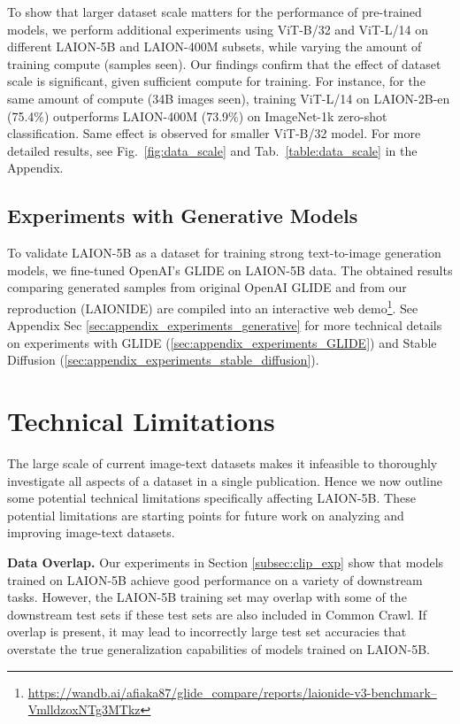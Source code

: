 To show that larger dataset scale matters for the performance of pre-trained models, we perform additional experiments using  ViT-B/32 and ViT-L/14 on different LAION-5B and LAION-400M subsets, while varying the amount of training compute (samples seen). Our findings confirm that the effect of dataset scale is significant, given sufficient compute for training. For instance, for the same amount of compute (34B images seen), training ViT-L/14 on LAION-2B-en (75.4\%) outperforms LAION-400M (73.9\%) on ImageNet-1k zero-shot classification. Same effect is observed for smaller ViT-B/32 model. For more detailed results, see Fig.~\ref{fig:data_scale} and Tab.~\ref{table:data_scale} in the Appendix.  

\subsection{Experiments with Generative Models}

\label{subsec:laionide_exp}
To validate LAION-5B as a dataset for training strong text-to-image generation models, we fine-tuned OpenAI's GLIDE \cite{GLIDE} on LAION-5B data. The obtained results comparing generated samples from original OpenAI GLIDE and from our reproduction (LAIONIDE) are compiled into an interactive web demo\footnote{\href{https://wandb.ai/afiaka87/glide_compare/reports/laionide-v3-benchmark--VmlldzoxNTg3MTkz}{https://wandb.ai/afiaka87/glide\_compare/reports/laionide-v3-benchmark--VmlldzoxNTg3MTkz}}. See Appendix Sec \ref{sec:appendix_experiments_generative} for more technical details on experiments with GLIDE (\ref{sec:appendix_experiments_GLIDE}) and Stable Diffusion (\ref{sec:appendix_experiments_stable_diffusion}). 

\section{Technical Limitations}
\label{sec:strengths_and_weaknesses}

The large scale of current image-text datasets makes it infeasible to thoroughly investigate all aspects of a dataset in a single publication. Hence we now outline some potential technical limitations specifically affecting LAION-5B. These potential limitations are starting points for future work on analyzing and improving image-text datasets.

\textbf{Data Overlap.} Our experiments in Section \ref{subsec:clip_exp} show that models trained on LAION-5B achieve good performance on a variety of downstream tasks. However, the LAION-5B training set may overlap with some of the downstream test sets if these test sets are also included in Common Crawl. If overlap is present, it may lead to incorrectly large test set accuracies that overstate the true generalization capabilities of models trained on LAION-5B.

